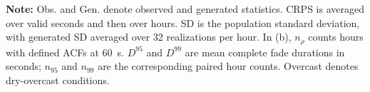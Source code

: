 \begin{table}[t]
\begin{tabular*}{\columnwidth}
\bottomrule
\end{tabular*}

\par\smallskip
\begin{minipage}{\columnwidth}
\footnotesize
\textbf{Note:}
Obs. and Gen. denote observed and generated statistics. CRPS is averaged over valid seconds and then over hours. SD is the population standard deviation, with generated SD averaged over 32 realizations per hour. In (b), \(n_{\rho}\) counts hours with defined ACFs at 60~s. \(D^{95}\) and \(D^{99}\) are mean complete fade durations in seconds; \(n_{95}\) and \(n_{99}\) are the corresponding paired hour counts. Overcast denotes dry-overcast conditions.
\end{minipage}

\end{table}
